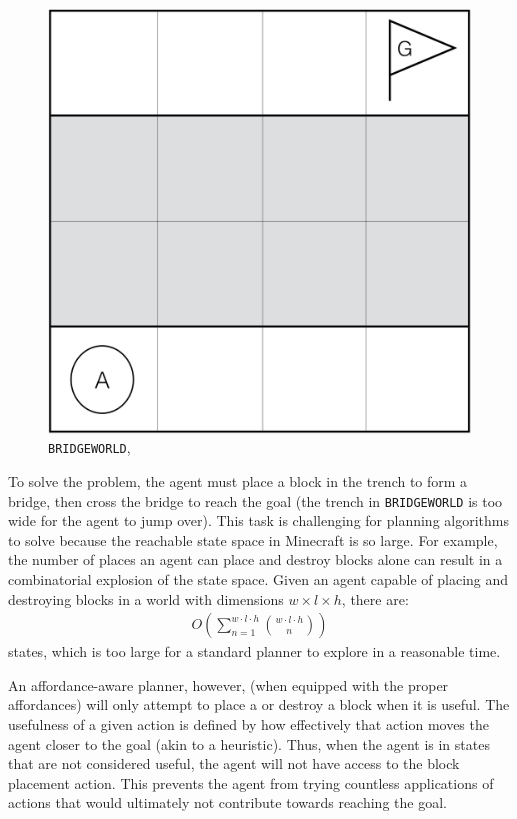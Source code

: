 \documentclass[]{article}
\begin{document}
\begin{figure}
\centering
\includegraphics[scale=0.2]{figures/bridgeworld.png}
\caption{\texttt{BRIDGEWORLD},
\label{fig:bridgeworld}}
\end{figure}

To solve the problem, the agent must place a block in the trench to
form a bridge, then cross the bridge to reach the goal (the trench in \texttt{BRIDGEWORLD} 
is too wide for the agent to jump over).  This task is
challenging for planning algorithms to solve because the reachable
state space in Minecraft is so large. For example, the number of
places an agent can place and destroy blocks alone can result in a
combinatorial explosion of the state space. Given an
agent capable of placing and destroying blocks in a world with dimensions
$w \times l \times h$, there are:
\begin{align}
O\left(\sum_{n=1}^{w \cdot l \cdot h} \binom{w \cdot l \cdot h}{n}\right)
\label{eq:mc_explode}
\end{align}
states, which is too large for a standard planner to explore in a
reasonable time.

An affordance-aware planner, however, (when equipped with the proper
affordances) will only attempt to place a or destroy a block when it is useful.
The usefulness of a given action is defined by how effectively that action moves 
the agent closer to the goal (akin to a heuristic). Thus, when the agent is in states that
are not considered useful, the agent will not have access to the block placement action. This prevents the agent
from trying countless applications of actions that would ultimately
not contribute towards reaching the goal.
\end{document}
